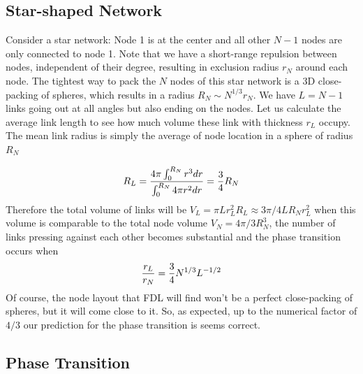 \documentclass[linenumbers,endfloats,nofootinbib,preprint,floatfix,titlepage,superscriptaddress]{revtex4-1} %
\begin{document}
\subsection{Star-shaped Network}
Consider a star network: 
Node 1 is at the center and all other $N-1$ nodes are only connected to node 1. 
Note that we have a short-range repulsion between nodes, independent of their degree, resulting in exclusion radius $r_N$ around each node. 
The tightest way to pack the $N$ nodes of this star network is a 3D close-packing of spheres, which results in a radius $R_N\sim N^{1/3}r_N$.
We have $L=N-1$ links going out at all angles but also ending on the nodes.
Let us calculate the average link length to see how much volume these link with thickness $r_L$ occupy. 
The mean link radius is simply the average of node location in a sphere of radius $R_N$ 

\begin{align}
    R_L =  \frac{4\pi \int_0^{R_N} r^3dr }{\int_0^{R_N} 4\pi r^2 dr} = {3\over 4} R_N
    \label{eq:RL}
\end{align}
Therefore the total volume of links will be $V_L = \pi L r_L^2 R_L \approx 3\pi/4 L R_N r_L^2 $ when this volume is comparable to the total node volume $V_N = 4\pi/3 R_N^3$, the number of links pressing against each other becomes substantial and the phase transition occurs when
%
\[ {r_L\over r_N} = {3\over 4} N^{1/3}L^{-1/2}\]
%
Of course, the node layout that FDL will find won't be a perfect close-packing of spheres, but it will come close to it.
So, as expected, up to the numerical factor of $4/3$ our prediction for the phase transition is seems correct.


\subsection{Phase Transition}
\end{document}
